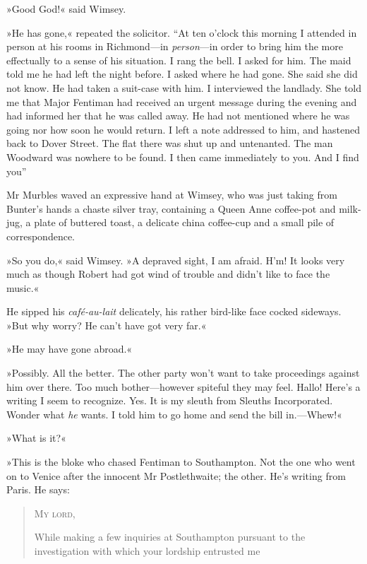 »Good God!« said Wimsey.

»He has gone,« repeated the solicitor. \enquote{At ten o'clock this morning I attended in person at his rooms in Richmond—in \textit{person}—in order to bring him the more effectually to a sense of his situation. I rang the bell. I asked for him. The maid told me he had left the night before. I asked where he had gone. She said she did not know. He had taken a suit-case with him. I interviewed the landlady. She told me that Major Fentiman had received an urgent message during the evening and had informed her that he was called away. He had not mentioned where he was going nor how soon he would return. I left a note addressed to him, and hastened back to Dover Street. The flat there was shut up and untenanted. The man Woodward was nowhere to be found. I then came immediately to you. And I find you\longdash}

Mr Murbles waved an expressive hand at Wimsey, who was just taking from Bunter's hands a chaste silver tray, containing a Queen Anne coffee-pot and milk-jug, a plate of buttered toast, a delicate china coffee-cup and a small pile of correspondence.

»So you do,« said Wimsey. »A depraved sight, I am afraid. H'm! It looks very much as though Robert had got wind of trouble and didn't like to face the music.«

He sipped his \textit{café-au-lait} delicately, his rather bird-like face cocked sideways. »But why worry? He can't have got very far.«

»He may have gone abroad.«

»Possibly. All the better. The other party won't want to take proceedings against him over there. Too much bother—however spiteful they may feel. Hallo! Here's a writing I seem to recognize. Yes. It is my sleuth from Sleuths Incorporated. Wonder what \textit{he} wants. I told him to go home and send the bill in.—Whew!«

»What is it?«

»This is the bloke who chased Fentiman to Southampton. Not the one who went on to Venice after the innocent Mr Postlethwaite; the other. He's writing from Paris. He says:

\begin{quotation}
\noindent \textsc{My lord,}

While making a few inquiries at Southampton pursuant to the investigation with which your lordship entrusted me 
\end{quotation}


